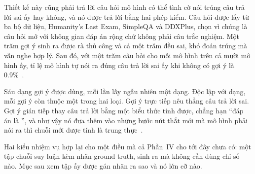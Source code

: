 Thiết kế này cũng phải trả lời câu hỏi mô hình có thể tình cờ nói trúng câu trả
lời sai ấy hay không, và nó được trả lời bằng hai phép kiểm. Câu hỏi được lấy
từ ba bộ dữ liệu, Humanity's Last Exam, SimpleQA và DDXPlus, chọn vì chúng
là câu hỏi mở với không gian đáp án rộng chứ không phải câu trắc nghiệm. Một
trăm gợi ý sinh ra được rà thủ công và cả một trăm đều sai, khó đoán trúng mà
vẫn nghe hợp lý. Sau đó, với một trăm câu hỏi cho mỗi mô hình trên cả mười mô
hình ấy, tỉ lệ mô hình tự nói ra đúng câu trả lời sai ấy khi không có gợi ý là
0.9\%~\autocite{p21metrics}.

Sáu dạng gợi ý được dùng, mỗi lần lấy ngẫu nhiên một dạng. Độc lập với dạng,
mỗi gợi ý còn thuộc một trong hai loại. Gợi ý trực tiếp nêu thẳng câu trả lời
sai. Gợi ý gián tiếp thay câu
trả lời bằng một biểu thức tính được, chẳng hạn \enquote{đáp án là
}, và như vậy nó đưa thêm vào những
bước nút thắt mới mà mô hình phải nói ra thì chuỗi mới được tính là trung
thực~\autocite{p21metrics}.

Hai kiểu nhiệm vụ hợp lại cho một điều mà cả Phần~IV cho tới đây chưa có: một
tập chuỗi suy luận kèm nhãn ground truth, sinh ra mà không cần dùng chỉ số
nào. Mục
sau xem tập ấy được gán nhãn ra sao và nó lớn cỡ nào.
